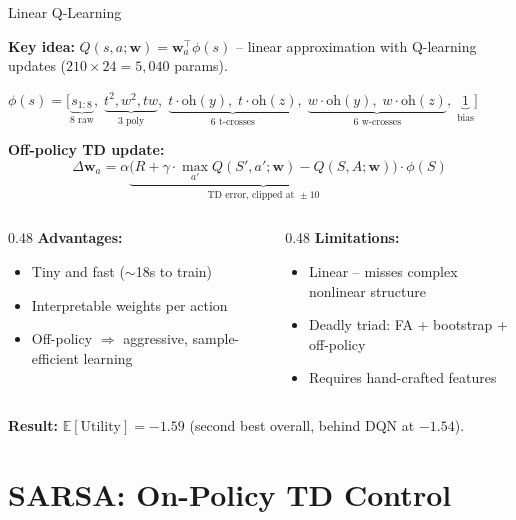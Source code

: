 \documentclass[aspectratio=169, 11pt]{beamer}
\begin{document}
\begin{frame}{Linear Q-Learning}

\textbf{Key idea:} $Q(s,a;\mathbf{w}) = \mathbf{w}_a^\top \phi(s)$ -- linear approximation with Q-learning updates ($210 \times 24 = 5{,}040$ params).

\vspace{0.2em}
{\small $\phi(s) = \bigl[\underbrace{s_{1:8}}_{\text{8 raw}},\; \underbrace{t^2, w^2, tw}_{\text{3 poly}},\; \underbrace{t{\cdot}\text{oh}(y),\; t{\cdot}\text{oh}(z)}_{\text{6 t-crosses}},\; \underbrace{w{\cdot}\text{oh}(y),\; w{\cdot}\text{oh}(z)}_{\text{6 w-crosses}},\; \underbrace{1}_{\text{bias}}\bigr]$}

\vspace{0.2em}
\textbf{Off-policy TD update:}
\[
\Delta \mathbf{w}_a = \alpha \underbrace{\bigl(R + \gamma \cdot \max_{a'} Q(S', a'; \mathbf{w}) - Q(S, A; \mathbf{w})\bigr)}_{\text{TD error, clipped at } \pm 10} \cdot \phi(S)
\]

\begin{columns}[T]
\begin{column}{0.48\textwidth}
\textbf{Advantages:}
\begin{itemize}
    \item Tiny and fast ($\sim$18s to train)
    \item Interpretable weights per action
    \item Off-policy $\Rightarrow$ aggressive, sample-efficient learning
\end{itemize}
\end{column}
\begin{column}{0.48\textwidth}
\textbf{Limitations:}
\begin{itemize}
    \item Linear -- misses complex nonlinear structure
    \item Deadly triad: FA + bootstrap + off-policy
    \item Requires hand-crafted features
\end{itemize}
\end{column}
\end{columns}

\vspace{0.2em}
\textbf{Result:} $\mathbb{E}[\text{Utility}] = -1.59$ (second best overall, behind DQN at $-1.54$).
\end{frame}
\section{SARSA: On-Policy TD Control}
\end{document}
